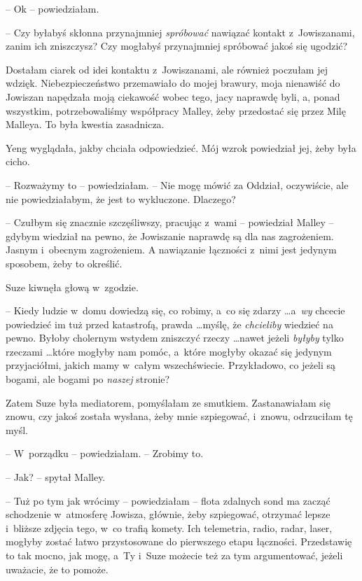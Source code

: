 \documentclass[oneside,polish,11pt,sfheadings]{mwbk}
\begin{document}
-- Ok -- powiedziałam.

-- Czy byłabyś skłonna przynajmniej \textit{spróbować} nawiązać kontakt z~Jowiszanami, zanim ich zniszczysz? Czy mogłabyś przynajmniej spróbować
jakoś się ugodzić?

Dostałam ciarek od idei kontaktu z~Jowiszanami, ale również poczułam jej
wdzięk. Niebezpieczeństwo przemawiało do mojej brawury, moja nienawiść
do Jowiszan napędzała moją ciekawość wobec tego, jacy naprawdę byli, a,
ponad wszystkim, potrzebowaliśmy współpracy Malley, żeby przedostać się
przez Milę Malleya. To była kwestia zasadnicza.

Yeng wyglądała, jakby chciała odpowiedzieć. Mój wzrok powiedział jej,
żeby była cicho.

-- Rozważymy to -- powiedziałam. -- Nie mogę mówić za Oddział, oczywiście,
ale nie powiedziałabym, że jest to wykluczone. Dlaczego?

-- Czułbym się znacznie szczęśliwszy, pracując z~wami -- powiedział Malley
-- gdybym wiedział na pewno, że Jowiszanie naprawdę są dla nas
zagrożeniem. Jasnym i~obecnym zagrożeniem. A nawiązanie łączności z~nimi
jest jedynym sposobem, żeby to określić.

Suze kiwnęła głową w~zgodzie.

-- Kiedy ludzie w~domu dowiedzą się, co
robimy, a~co się zdarzy \ldots  a~\textit{wy} chcecie powiedzieć im tuż przed
katastrofą, prawda \ldots  myślę, że \textit{chcieliby} wiedzieć na pewno.
Byłoby cholernym wstydem zniszczyć rzeczy \ldots  nawet jeżeli \textit{byłyby}
tylko rzeczami \ldots  które mogłyby nam pomóc, a~które mogłyby okazać się
jedynym przyjaciółmi, jakich mamy w~całym wszechświecie. Przykładowo, co
jeżeli są bogami, ale bogami po \textit{naszej} stronie?

Zatem Suze była mediatorem, pomyślałam ze smutkiem. Zastanawiałam się
znowu, czy jakoś została wysłana, żeby mnie szpiegować, i~znowu,
odrzuciłam tę myśl.

-- W~porządku -- powiedziałam. -- Zrobimy to.

-- Jak? -- spytał Malley.

-- Tuż po tym jak wrócimy -- powiedziałam -- flota zdalnych sond ma zacząć
schodzenie w~atmosferę Jowisza, głównie, żeby szpiegować, otrzymać
lepsze i~bliższe zdjęcia tego, w~co trafią komety. Ich telemetria,
radio, radar, laser, mogłyby zostać łatwo przystosowane do pierwszego
etapu łączności. Przedstawię to tak mocno, jak mogę, a~Ty i~Suze możecie
też za tym argumentować, jeżeli uważacie, że to pomoże.
\end{document}
